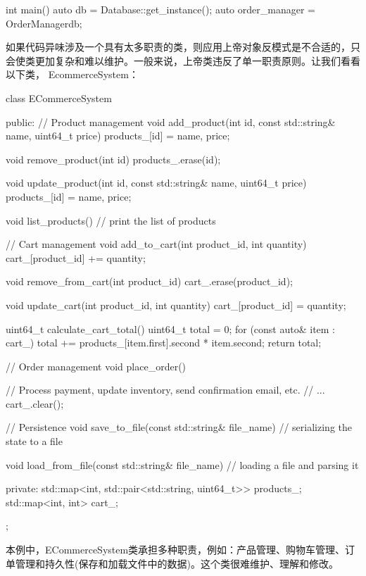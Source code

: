 \begin{cpp}
int main() {
    auto db = Database::get_instance();
    auto order_manager = OrderManager{db};
}
\end{cpp}

如果代码异味涉及一个具有太多职责的类，则应用上帝对象反模式是不合适的，只会使类更加复杂和难以维护。一般来说，上帝类违反了单一职责原则。让我们看看以下类， EcommerceSystem：

\begin{cpp}
class ECommerceSystem {
public:
    // Product management
    void add_product(int id, const std::string& name, uint64_t price)
    {
        products_[id] = {name, price};
    }

    void remove_product(int id) {
        products_.erase(id);
    }

    void update_product(int id, const std::string& name, uint64_t
    price) {
        products_[id] = {name, price};
    }

    void list_products() {
        // print the list of products
    }

    // Cart management
    void add_to_cart(int product_id, int quantity) {
        cart_[product_id] += quantity;
    }

    void remove_from_cart(int product_id) {
        cart_.erase(product_id);
    }

    void update_cart(int product_id, int quantity) {
        cart_[product_id] = quantity;
    }

    uint64_t calculate_cart_total() {
        uint64_t total = 0;
        for (const auto& item : cart_) {
            total += products_[item.first].second * item.second;
        }
        return total;
    }

    // Order management
    void place_order() {

        // Process payment, update inventory, send confirmation email,
        etc.
        // ...
        cart_.clear();
    }

    // Persistence
    void save_to_file(const std::string& file_name) {
        // serializing the state to a file
    }

    void load_from_file(const std::string& file_name) {
        // loading a file and parsing it
    }

private:
    std::map<int, std::pair<std::string, uint64_t>> products_;
    std::map<int, int> cart_;
};
\end{cpp}

本例中，ECommerceSystem类承担多种职责，例如：产品管理、购物车管理、订单管理和持久性(保存和加载文件中的数据)。这个类很难维护、理解和修改。

